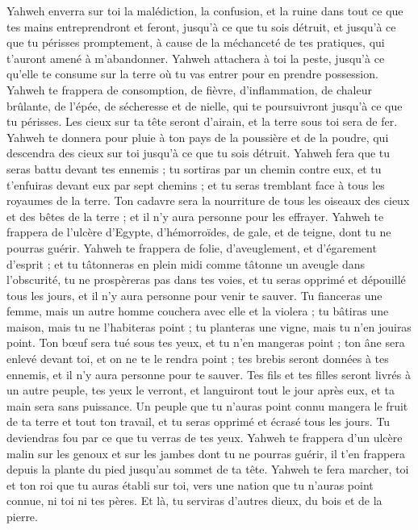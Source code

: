 \begin{multicols}{2}
Yahweh enverra sur toi la malédiction, la confusion, et la ruine dans tout ce que tes mains entreprendront et feront, jusqu'à ce que tu sois détruit, et jusqu’à ce que tu périsses promptement, à cause de la méchanceté de tes pratiques, qui t’auront amené à m’abandonner.
Yahweh attachera à toi la peste, jusqu'à ce qu'elle te consume sur la terre où tu vas entrer pour en prendre possession.
Yahweh te frappera de consomption, de fièvre, d’inflammation, de chaleur brûlante, de l’épée, de sécheresse et de nielle, qui te poursuivront jusqu'à ce que tu périsses.
Les cieux sur ta tête seront d'airain, et la terre sous toi sera de fer.
Yahweh te donnera pour pluie à ton pays de la poussière et de la poudre, qui descendra des cieux sur toi jusqu'à ce que tu sois détruit.
Yahweh fera que tu seras battu devant tes ennemis ; tu sortiras par un chemin contre eux, et tu t'enfuiras devant eux par sept chemins ; et tu seras tremblant face à tous les royaumes de la terre.
Ton cadavre sera la nourriture de tous les oiseaux des cieux et des bêtes de la terre ; et il n'y aura personne pour les effrayer.
Yahweh te frappera de l'ulcère d'Egypte, d'hémorroïdes, de gale, et de teigne, dont tu ne pourras guérir.
Yahweh te frappera de folie, d'aveuglement, et d’égarement d’esprit ;
et tu tâtonneras en plein midi comme tâtonne un aveugle dans l’obscurité, tu ne prospèreras pas dans tes voies, et tu seras opprimé et dépouillé tous les jours, et il n’y aura personne pour venir te sauver.
Tu fianceras une femme, mais un autre homme couchera avec elle et la violera ; tu bâtiras une maison, mais tu ne l’habiteras point ; tu planteras une vigne, mais tu n'en jouiras point.
Ton bœuf sera tué sous tes yeux, et tu n'en mangeras point ; ton âne sera enlevé devant toi, et on ne te le rendra point ; tes brebis seront données à tes ennemis, et il n’y aura personne pour te sauver.
Tes fils et tes filles seront livrés à un autre peuple, tes yeux le verront, et languiront tout le jour après eux, et ta main sera sans puissance.
Un peuple que tu n'auras point connu mangera le fruit de ta terre et tout ton travail, et tu seras opprimé et écrasé tous les jours.
Tu deviendras fou par ce que tu verras de tes yeux.
Yahweh te frappera d'un ulcère malin sur les genoux et sur les jambes dont tu ne pourras guérir, il t'en frappera depuis la plante du pied jusqu'au sommet de ta tête.
Yahweh te fera marcher, toi et ton roi que tu auras établi sur toi, vers une nation que tu n'auras point connue, ni toi ni tes pères. Et là, tu serviras d'autres dieux, du bois et de la pierre.

\end{multicols}
